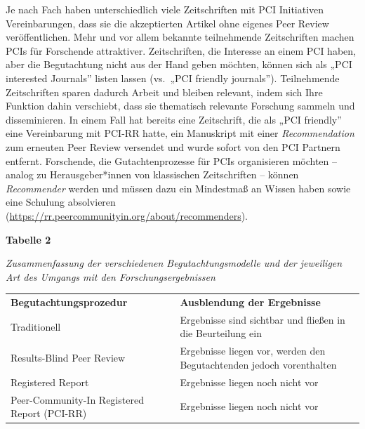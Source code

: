 \documentclass[
  letterpaper,
  DIV=11,
  numbers=noendperiod]{scrreprt}
\begin{document}
Je nach Fach haben unterschiedlich viele Zeitschriften mit PCI
Initiativen Vereinbarungen, dass sie die akzeptierten Artikel ohne
eigenes Peer Review veröffentlichen. Mehr und vor allem bekannte
teilnehmende Zeitschriften machen PCIs für Forschende attraktiver.
Zeitschriften, die Interesse an einem PCI haben, aber die Begutachtung
nicht aus der Hand geben möchten, können sich als „PCI interested
Journals'' listen lassen (vs.~„PCI friendly journals''). Teilnehmende
Zeitschriften sparen dadurch Arbeit und bleiben relevant, indem sich
Ihre Funktion dahin verschiebt, dass sie thematisch relevante Forschung
sammeln und disseminieren. In einem Fall hat bereits eine Zeitschrift,
die als „PCI friendly'' eine Vereinbarung mit PCI-RR hatte, ein
Manuskript mit einer \emph{Recommendation} zum erneuten Peer Review
versendet und wurde sofort von den PCI Partnern entfernt. Forschende,
die Gutachtenprozesse für PCIs organisieren möchten -- analog zu
Herausgeber*innen von klassischen Zeitschriften -- können
\emph{Recommender} werden und müssen dazu ein Mindestmaß an Wissen haben
sowie eine Schulung absolvieren
(\url{https://rr.peercommunityin.org/about/recommenders}).

\textbf{Tabelle 2}

\emph{Zusammenfassung der verschiedenen Begutachtungsmodelle und der
jeweiligen Art des Umgangs mit den Forschungsergebnissen}

\begin{longtable}[]{@{}
  >{\raggedright\arraybackslash}p{}
  >{\raggedright\arraybackslash}p{}@{}}
\toprule\noalign{}
\endhead
\bottomrule\noalign{}
\endlastfoot
\textbf{Begutachtungsprozedur} & \textbf{Ausblendung der Ergebnisse} \\
Traditionell & Ergebnisse sind sichtbar und fließen in die Beurteilung
ein \\
Results-Blind Peer Review & Ergebnisse liegen vor, werden den
Begutachtenden jedoch vorenthalten \\
Registered Report & Ergebnisse liegen noch nicht vor \\
Peer-Community-In Registered Report (PCI-RR) & Ergebnisse liegen noch
nicht vor \\
\end{longtable}
\end{document}
